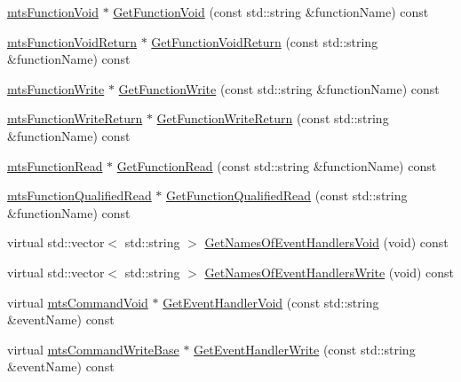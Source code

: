 {\bf }\par
\begin{DoxyCompactItemize}
\item 
\hyperlink{classmts_function_void}{mts\-Function\-Void} $\ast$ \hyperlink{classmts_interface_required_ab156f9cad1e69fe8456179042cc4806a}{Get\-Function\-Void} (const std\-::string \&function\-Name) const 
\item 
\hyperlink{classmts_function_void_return}{mts\-Function\-Void\-Return} $\ast$ \hyperlink{classmts_interface_required_a5a72c1384648680bcf899fab524d58dd}{Get\-Function\-Void\-Return} (const std\-::string \&function\-Name) const 
\item 
\hyperlink{classmts_function_write}{mts\-Function\-Write} $\ast$ \hyperlink{classmts_interface_required_a69eac9c2fdbcc6209382cc6fb6c5bda0}{Get\-Function\-Write} (const std\-::string \&function\-Name) const 
\item 
\hyperlink{classmts_function_write_return}{mts\-Function\-Write\-Return} $\ast$ \hyperlink{classmts_interface_required_aa6149578dd20d9eb0d97aaba80cd2121}{Get\-Function\-Write\-Return} (const std\-::string \&function\-Name) const 
\item 
\hyperlink{classmts_function_read}{mts\-Function\-Read} $\ast$ \hyperlink{classmts_interface_required_a13821b12b235343bf92820d78a43584d}{Get\-Function\-Read} (const std\-::string \&function\-Name) const 
\item 
\hyperlink{classmts_function_qualified_read}{mts\-Function\-Qualified\-Read} $\ast$ \hyperlink{classmts_interface_required_ad218c505c56d2cea349a687f5926ad0f}{Get\-Function\-Qualified\-Read} (const std\-::string \&function\-Name) const 
\end{DoxyCompactItemize}

{\bf }\par
\begin{DoxyCompactItemize}
\item 
virtual std\-::vector$<$ std\-::string $>$ \hyperlink{classmts_interface_required_a47f0c0792a0cae45da75ecdf9c001eb5}{Get\-Names\-Of\-Event\-Handlers\-Void} (void) const 
\item 
virtual std\-::vector$<$ std\-::string $>$ \hyperlink{classmts_interface_required_a0aa3164f69506d2c4e3d0f590b86dfb1}{Get\-Names\-Of\-Event\-Handlers\-Write} (void) const 
\end{DoxyCompactItemize}

{\bf }\par
\begin{DoxyCompactItemize}
\item 
virtual \hyperlink{classmts_command_void}{mts\-Command\-Void} $\ast$ \hyperlink{classmts_interface_required_afb1d3622285a0dbff64a82fd87857b03}{Get\-Event\-Handler\-Void} (const std\-::string \&event\-Name) const 
\item 
virtual \hyperlink{classmts_command_write_base}{mts\-Command\-Write\-Base} $\ast$ \hyperlink{classmts_interface_required_ad9152915390ff74af0264d59357f64fb}{Get\-Event\-Handler\-Write} (const std\-::string \&event\-Name) const 
\end{DoxyCompactItemize}

